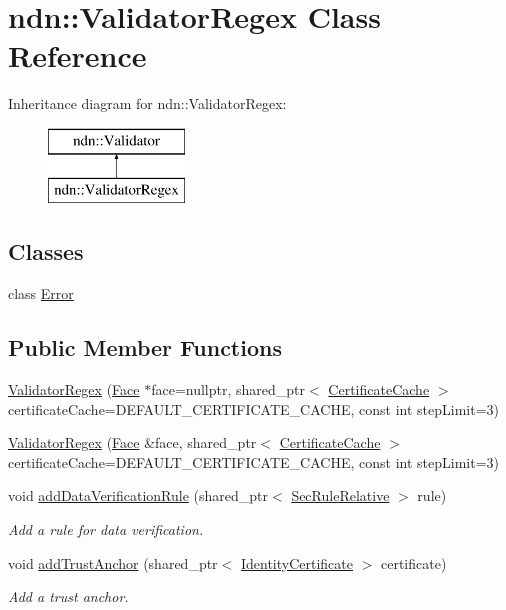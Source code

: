 \hypertarget{classndn_1_1ValidatorRegex}{}\section{ndn\+:\+:Validator\+Regex Class Reference}
\label{classndn_1_1ValidatorRegex}
Inheritance diagram for ndn\+:\+:Validator\+Regex\+:\begin{figure}[H]
\begin{center}
\leavevmode
\includegraphics[height=2.000000cm]{classndn_1_1ValidatorRegex}
\end{center}
\end{figure}
\subsection*{Classes}
\begin{DoxyCompactItemize}
\item 
class \hyperlink{classndn_1_1ValidatorRegex_1_1Error}{Error}
\end{DoxyCompactItemize}
\subsection*{Public Member Functions}
\begin{DoxyCompactItemize}
\item 
\hyperlink{classndn_1_1ValidatorRegex_ac012a42b52b9f951980e9789f33552f3}{Validator\+Regex} (\hyperlink{classndn_1_1Face}{Face} $\ast$face=nullptr, shared\+\_\+ptr$<$ \hyperlink{classndn_1_1CertificateCache}{Certificate\+Cache} $>$ certificate\+Cache=D\+E\+F\+A\+U\+L\+T\+\_\+\+C\+E\+R\+T\+I\+F\+I\+C\+A\+T\+E\+\_\+\+C\+A\+C\+HE, const int step\+Limit=3)
\item 
\hyperlink{classndn_1_1ValidatorRegex_a6248c8e01f7d82e472e3c53d5be31103}{Validator\+Regex} (\hyperlink{classndn_1_1Face}{Face} \&face, shared\+\_\+ptr$<$ \hyperlink{classndn_1_1CertificateCache}{Certificate\+Cache} $>$ certificate\+Cache=D\+E\+F\+A\+U\+L\+T\+\_\+\+C\+E\+R\+T\+I\+F\+I\+C\+A\+T\+E\+\_\+\+C\+A\+C\+HE, const int step\+Limit=3)
\item 
void \hyperlink{classndn_1_1ValidatorRegex_a84bb3a270768927e062185677e58e8bf}{add\+Data\+Verification\+Rule} (shared\+\_\+ptr$<$ \hyperlink{classndn_1_1SecRuleRelative}{Sec\+Rule\+Relative} $>$ rule)
\begin{DoxyCompactList}\small\item\em Add a rule for data verification. \end{DoxyCompactList}\item 
void \hyperlink{classndn_1_1ValidatorRegex_a19e56472450198e875995c6e9c6c931a}{add\+Trust\+Anchor} (shared\+\_\+ptr$<$ \hyperlink{classndn_1_1IdentityCertificate}{Identity\+Certificate} $>$ certificate)
\begin{DoxyCompactList}\small\item\em Add a trust anchor. \end{DoxyCompactList}\end{DoxyCompactItemize}
